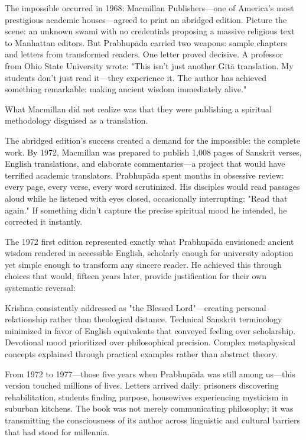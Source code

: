 \documentclass[12pt,twoside]{book}
\begin{document}
The impossible occurred in 1968: Macmillan Publishers—one of America's most prestigious academic houses—agreed to print an abridged edition. Picture the scene: an unknown swami with no credentials proposing a massive religious text to Manhattan editors. But Prabhupāda carried two weapons: sample chapters and letters from transformed readers. One letter proved decisive. A professor from Ohio State University wrote: "This isn't just another Gītā translation. My students don't just read it—they experience it. The author has achieved something remarkable: making ancient wisdom immediately alive."

What Macmillan did not realize was that they were publishing a spiritual methodology disguised as a translation.

The abridged edition's success created a demand for the impossible: the complete work. By 1972, Macmillan was prepared to publish 1,008 pages of Sanskrit verses, English translations, and elaborate commentaries—a project that would have terrified academic translators. Prabhupāda spent months in obsessive review: every page, every verse, every word scrutinized. His disciples would read passages aloud while he listened with eyes closed, occasionally interrupting: "Read that again." If something didn't capture the precise spiritual mood he intended, he corrected it instantly.

The 1972 first edition represented exactly what Prabhupāda envisioned: ancient wisdom rendered in accessible English, scholarly enough for university adoption yet simple enough to transform any sincere reader. He achieved this through choices that would, fifteen years later, provide justification for their own systematic reversal:

Krishna consistently addressed as "the Blessed Lord"—creating personal relationship rather than theological distance. Technical Sanskrit terminology minimized in favor of English equivalents that conveyed feeling over scholarship. Devotional mood prioritized over philosophical precision. Complex metaphysical concepts explained through practical examples rather than abstract theory.

From 1972 to 1977—those five years when Prabhupāda was still among us—this version touched millions of lives. Letters arrived daily: prisoners discovering rehabilitation, students finding purpose, housewives experiencing mysticism in suburban kitchens. The book was not merely communicating philosophy; it was transmitting the consciousness of its author across linguistic and cultural barriers that had stood for millennia.
\end{document}
